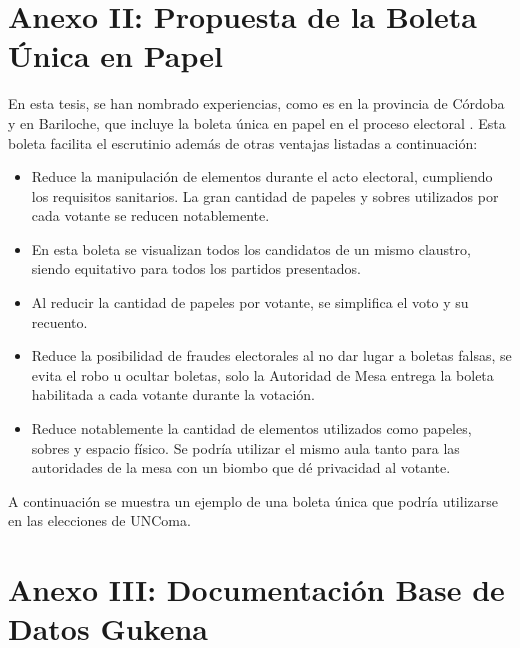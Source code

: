 \chapter{Anexo II: Propuesta de la Boleta Única en Papel}
\label{BU}
En esta tesis, se han nombrado experiencias, como es en la provincia de Córdoba y en Bariloche, que incluye la boleta única en papel en el proceso electoral \cite{reglamentoBU}. Esta boleta facilita el escrutinio además de otras ventajas listadas a continuación:
\begin{itemize}
    \item Reduce la manipulación de elementos durante el acto electoral, cumpliendo los requisitos sanitarios. La gran cantidad de papeles y sobres utilizados por cada votante se reducen notablemente. 
    \item En esta boleta se visualizan todos los candidatos de un mismo claustro, siendo equitativo para todos los partidos presentados.
    \item Al reducir la cantidad de papeles por votante, se simplifica el voto y su recuento.
    \item Reduce la posibilidad de fraudes electorales al no dar lugar a boletas falsas, se evita el robo u ocultar boletas, solo la Autoridad de Mesa entrega la boleta habilitada a cada votante durante la votación.
    \item Reduce notablemente la cantidad de elementos utilizados como papeles, sobres y espacio físico. Se podría utilizar el mismo aula tanto para las autoridades de la mesa con un biombo que dé privacidad al votante.
\end{itemize}

A continuación se muestra un ejemplo de una boleta única que podría utilizarse en las elecciones de UNComa.



\chapter{Anexo III: Documentación Base de Datos Gukena}



